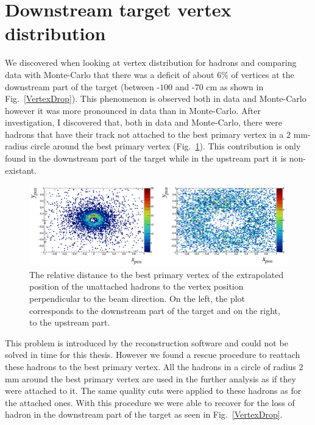 
\section{Downstream target vertex distribution}

We discovered when looking at vertex distribution for hadrons and comparing data with Monte-Carlo that there was a deficit of about $6$\% of vertices at the downstream part of the target (between -$100$ and -$70$ cm as shown in Fig.~\ref{VertexDrop}). This phenomenon is observed both in data and Monte-Carlo however it was more pronounced in data than in Monte-Carlo. After investigation, I discovered that, both in data and Monte-Carlo, there were hadrons that have their track not attached to the best primary vertex in a $2$ mm-radius circle around the best primary vertex (Fig.~\ref{CircleHadron}). This contribution is only found in the downstream part of the target while in the upstream part it is non-existant.

\begin{figure}[!h]
	\includegraphics[scale=0.45]{./gfx/CircleHadron.png}
	\caption{The relative distance to the best primary vertex of the extrapolated position of the unattached hadrons to the vertex position perpendicular to the beam direction. On the left, the plot corresponds to the downstream part of the target and on the right, to the upstream part.}
	\label{CircleHadron}
\end{figure}

This problem is introduced by the reconstruction software and could not be solved in time for this thesis. However we found a rescue procedure to reattach these hadrons to the best primary vertex. All the hadrons in a circle of radius $2$ mm around the best primary vertex are used in the further analysis as if they were attached to it. The same quality cuts were applied to these hadrons as for the attached ones. With this procedure we were able to recover for the loss of hadron in the downstream part of the target as seen in Fig.~\ref{VertexDrop}.

